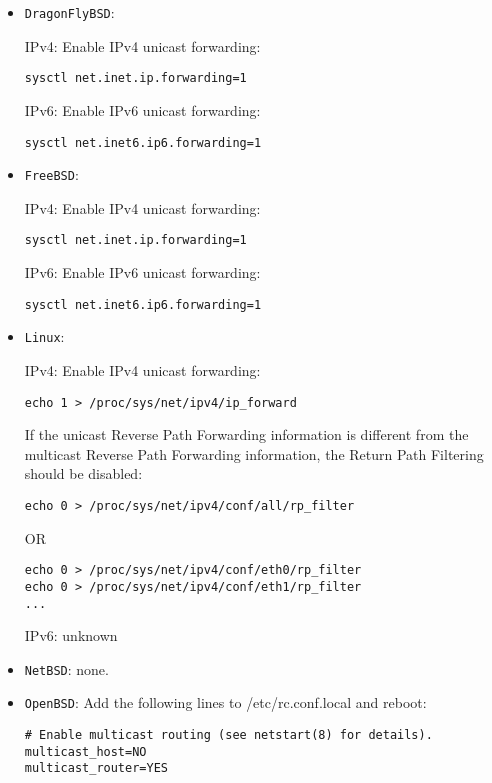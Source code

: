 \begin{itemize}
\begin{itemize}
    \item {\tt DragonFlyBSD}:

    IPv4: Enable IPv4 unicast forwarding:

\begin{verbatim}
sysctl net.inet.ip.forwarding=1
\end{verbatim}

    IPv6: Enable IPv6 unicast forwarding:

\begin{verbatim}
sysctl net.inet6.ip6.forwarding=1
\end{verbatim}

    \item {\tt FreeBSD}:

    IPv4: Enable IPv4 unicast forwarding:

\begin{verbatim}
sysctl net.inet.ip.forwarding=1
\end{verbatim}

    IPv6: Enable IPv6 unicast forwarding:

\begin{verbatim}
sysctl net.inet6.ip6.forwarding=1
\end{verbatim}

    \item {\tt Linux}:

    IPv4: Enable IPv4 unicast forwarding:

\begin{verbatim}
echo 1 > /proc/sys/net/ipv4/ip_forward
\end{verbatim}

    If the unicast Reverse Path Forwarding information is different from the
    multicast Reverse Path Forwarding information, the Return Path Filtering
    should be disabled:

\begin{verbatim}
echo 0 > /proc/sys/net/ipv4/conf/all/rp_filter
\end{verbatim}
    OR
\begin{verbatim}
echo 0 > /proc/sys/net/ipv4/conf/eth0/rp_filter
echo 0 > /proc/sys/net/ipv4/conf/eth1/rp_filter
...
\end{verbatim}

    IPv6: unknown

    \item {\tt NetBSD}: none.

    \item {\tt OpenBSD}: Add the following lines to {\stt /etc/rc.conf.local}
    and reboot:

\begin{verbatim}
# Enable multicast routing (see netstart(8) for details).
multicast_host=NO
multicast_router=YES
\end{verbatim}

  \end{itemize}

\end{itemize}

